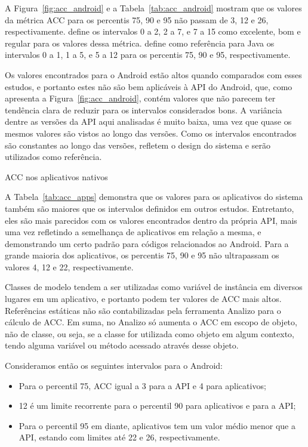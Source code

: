 A Figura~\ref{fig:acc_android} e a Tabela~\ref{tab:acc_android} mostram que os valores da métrica ACC para os percentis 75, 90 e 95 não passam de 3, 12 e 26, respectivamente.  define os intervalos 0 a 2, 2 a 7, e 7 a 15 como excelente, bom e regular para os valores dessa métrica.  define como referência para Java os intervalos 0 a 1, 1 a 5, e 5 a 12 para os percentis 75, 90 e 95, respectivamente.

Os valores encontrados para o Android estão altos quando comparados com esses estudos, e portanto estes não são bem aplicáveis à API do Android, que, como apresenta a Figura~\ref{fig:acc_android}, contém valores que não parecem ter tendência clara de reduzir para os intervalos considerados bons. A variância dentre as versões da API aqui analisadas é muito baixa, uma vez que quase os mesmos valores são vistos ao longo das versões. Como os intervalos encontrados são constantes ao longo das versões, refletem o design do sistema e serão utilizados como referência.

\begin{table}[!htb]
\centering
{}

\caption{ACC nos aplicativos nativos}
\label{tab:acc_apps}
\end{table}

A Tabela~\ref{tab:acc_apps} demonstra que os valores para os aplicativos do sistema também são maiores que os intervalos definidos em outros estudos. Entretanto, eles são mais parecidos com os valores encontrados dentro da própria API, mais uma vez refletindo a semelhança de aplicativos em relação a mesma, e demonstrando um certo padrão para códigos relacionados ao Android. Para a grande maioria dos aplicativos, os percentis 75, 90 e 95 não ultrapassam os valores 4, 12 e 22, respectivamente.

Classes de modelo tendem a ser utilizadas como variável de instância em diversos lugares em um aplicativo, e portanto podem ter valores de ACC mais altos. Referências estáticas não são contabilizadas pela ferramenta Analizo para o cálculo de ACC. Em suma, no Analizo só aumenta o ACC em escopo de objeto, não de classe, ou seja, se a classe for utilizada como objeto em algum contexto, tendo alguma variável ou método acessado através desse objeto.

Consideramos então os seguintes intervalos para o Android:

\begin{itemize}
\item Para o percentil 75, ACC igual a 3 para a API e 4 para aplicativos;
\item 12 é um limite recorrente para o percentil 90 para aplicativos e para a API;
\item Para o percentil 95 em diante, aplicativos tem um valor médio menor que a API, estando com limites até 22 e 26, respectivamente.
\end{itemize}

